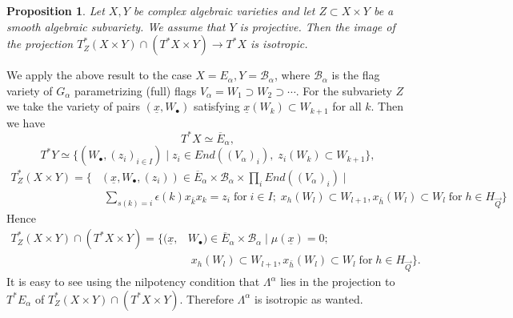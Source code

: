 \documentclass[a4paper,10pt]{amsart}
\def\a{\alpha}
\newtheorem{prop}[theo]{Proposition}
\numberwithin{equation}{section}
\begin{document}
\begin{prop} Let $X,Y$ be complex algebraic varieties and let $Z \subset X \times Y$ be a smooth algebraic subvariety. We assume that $Y$ is projective. Then the image of the projection
$T^*_Z(X \times Y) \cap (T^*X \times Y) \to T^*X$ is isotropic.
\end{prop}
We apply the above result to the case $X=E_{\a}, Y= \mathcal{B}_{\a}$, where $\mathcal{B}_{\a}$ is the flag variety of $G_{\a}$ parametrizing (full) flags $V_{\a} =W_1\supset W_2 \supset \cdots$. For the subvariety $Z$ we take the variety of pairs $(\underline{x}, W_{\bullet})$ satisfying $\underline{x} (W_k) \subset W_{k+1}$ for all $k$. Then we have
$$T^* X\simeq \overline{E}_{\a}, $$
$$T^*Y \simeq \big\{ (W_\bullet, (z_i)_{i \in I})\;|\; z_i \in End((V_{\a})_i),\; z_i(W_k) \subset W_{k+1}\big\},$$
\begin{equation*}
\begin{split}
T^*_Z(X \times Y)= \big\{ &(\underline{x}, W_{\bullet}, (z_i))\in \overline{E}_{\a} \times \mathcal{B}_{\a} \times \prod_i End((V_{\a})_i)\;|\\
&\; \sum_{s(k)=i} \epsilon(k) x_{\bar{k}} x_{k}=z_i\;\text{for}\;i \in I; \; x_h(W_l)\subset W_{l+1}, x_{\bar{h}}(W_l) \subset W_l\;\text{for}\;h \in H_{\vec{Q}} \big\}
\end{split}
\end{equation*}
Hence
\begin{equation*}
\begin{split}
T^*_Z(X \times Y) \cap (T^*X \times Y)=\big\{ (\underline{x}, &W_{\bullet})\in \overline{E}_{\a} \times \mathcal{B}_{\a} \;|\; \mu(\underline{x})=0;\\
 &\; x_h(W_l)\subset W_{l+1}, x_{\bar{h}}(W_l) \subset W_l\;\text{for}\;h \in H_{\vec{Q}} \big\}.
 \end{split}
 \end{equation*}
It is easy to see using the nilpotency condition that $\Lambda^{\a}$ lies in the projection to $T^*E_{\a}$ of $T^*_Z(X \times Y) \cap (T^*X \times Y)$. Therefore $\Lambda^{\a}$ is isotropic as wanted.

\vspace{.1in}
\end{document}
